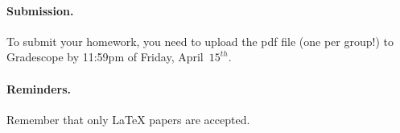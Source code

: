 \documentclass{article}
\begin{document}

\paragraph{Submission.}
To submit your homework, you need to upload the pdf file (one per group!) to Gradescope by 11:59pm of Friday, April~$15^{th}$. 

\paragraph{Reminders.}
Remember that only {\LaTeX} papers are accepted. 
\end{document}
